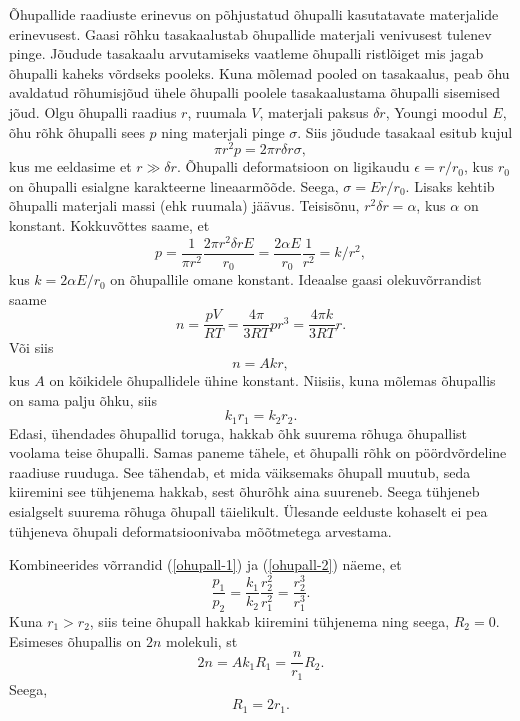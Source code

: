 \solu
Õhupallide raadiuste erinevus on põhjustatud õhupalli kasutatavate materjalide erinevusest. Gaasi rõhku tasakaalustab õhupallide materjali venivusest tulenev pinge. Jõudude tasakaalu arvutamiseks vaatleme õhupalli ristlõiget mis jagab õhupalli kaheks võrdseks pooleks. Kuna mõlemad pooled on tasakaalus, peab õhu avaldatud rõhumisjõud ühele õhupalli poolele tasakaalustama õhupalli sisemised jõud. Olgu õhupalli raadius $r$, ruumala $V$, materjali paksus $\delta r$, Youngi moodul $E$, õhu rõhk õhupalli sees $p$ ning materjali pinge $\sigma$. Siis jõudude tasakaal esitub kujul
\[
\pi r^2 p = 2\pi r\delta r \sigma,
\]
kus me eeldasime et $r \gg \delta r$. Õhupalli deformatsioon on ligikaudu $\epsilon = r / r_0$, kus $r_0$ on õhupalli esialgne karakteerne lineaarmõõde. Seega, $\sigma = Er/r_0$. Lisaks kehtib õhupalli materjali massi (ehk ruumala) jäävus. Teisisõnu, $r^2\delta r = \alpha$, kus $\alpha$ on konstant. Kokkuvõttes saame, et
\begin{equation}
p = \frac{1}{\pi r^2} \frac{2\pi r^2\delta rE}{r_0} = \frac{2\alpha E}{r_0}\frac{1}{r^2}  = k/r^2,
\label{ohupall-1}
\end{equation}
kus $k = 2\alpha E/r_0$ on õhupallile omane konstant. Ideaalse gaasi olekuvõrrandist saame
\[
n = \frac{pV}{RT} = \frac{4\pi}{3RT}pr^3 = \frac{4\pi k}{3RT}r.
\]
Või siis
\[
n = Akr,
\]
kus $A$ on kõikidele õhupallidele ühine konstant. Niisiis, kuna mõlemas õhupallis on sama palju õhku, siis
\begin{equation}
k_1r_1 = k_2r_2.
\label{ohupall-2}
\end{equation}
Edasi, ühendades õhupallid toruga, hakkab õhk suurema rõhuga õhupallist voolama teise õhupalli. Samas paneme tähele, et õhupalli rõhk on pöördvõrdeline raadiuse ruuduga. See tähendab, et mida väiksemaks õhupall muutub, seda kiiremini see tühjenema hakkab, sest õhurõhk aina suureneb. Seega tühjeneb esialgselt suurema rõhuga õhupall täielikult. Ülesande eelduste kohaselt ei pea tühjeneva õhupali deformatsioonivaba mõõtmetega arvestama.

Kombineerides võrrandid (\ref{ohupall-1}) ja (\ref{ohupall-2}) näeme, et
\[
\frac{p_1}{p_2} = \frac{k_1}{k_2} \frac{r_2^2}{r_1^2} = \frac{r_2^3}{r_1^3}.
\]
Kuna $r_1 > r_2$, siis teine õhupall hakkab kiiremini tühjenema ning seega, $R_2 = 0$. Esimeses õhupallis on $2n$ molekuli, st
\[
2n = Ak_1 R_1 = \frac{n}{r_1}R_2.
\]
Seega,
\[
R_1 = 2r_1.
\]
\probend